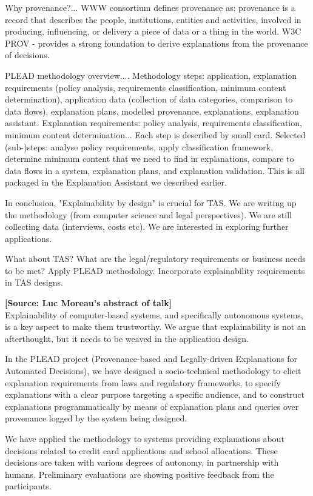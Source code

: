 \documentclass[sigconf]{acmart}
\begin{document}
Why provenance?...
WWW consortium defines provenance as: provenance is a record that describes the people, institutions, entities and activities, involved in producing, influencing, or delivery a piece of data or a thing in the world. W3C PROV - provides a strong foundation to derive explanations from the provenance of decisions. 

PLEAD methodology overview....
Methodology steps: application, explanation requirements (policy analysis, requirements classification, minimum content determination), application data (collection of data categories, comparison to data flows), explanation plans, modelled provenance, explanations, explanation assistant. 
Explanation requirements: policy analysis, requirements classification, minimum content determination...
Each step is described by small card. 
Selected (sub-)steps: analyse policy requirements, apply classification framework, determine minimum content that we need to find in explanations, compare to data flows in a system, explanation plans, and explanation validation. This is all packaged in the Explanation Assistant we described earlier.

In conclusion, "Explainability by design" is crucial for TAS. We are writing up the methodology (from computer science and legal perspectives). We are still collecting data (interviews, costs etc). We are interested in exploring further applications.

What about TAS? What are the legal/regulatory requirements or business needs to be met? Apply PLEAD methodology. Incorporate explainability requirements in TAS designs. 

\noindent\textbf{[Source: Luc Moreau's abstract of talk]}\\
Explainability of computer-based systems, and specifically autonomous systems, is a key aspect to make them trustworthy. We argue that explainability is not an afterthought, but it needs to be weaved in the application design.

In the PLEAD project (Provenance-based and Legally-driven Explanations for Automated Decisions), we have designed a socio-technical methodology to elicit explanation requirements from laws and regulatory frameworks, to specify explanations with a clear purpose targeting a specific audience, and to construct explanations programmatically by means of explanation plans and queries over provenance logged by the system being designed.

We have applied the methodology to systems providing explanations about decisions related to credit card applications and school allocations. These decisions are taken with various degrees of autonomy, in partnership with humans.  Preliminary evaluations are showing positive feedback from the participants.
\end{document}
